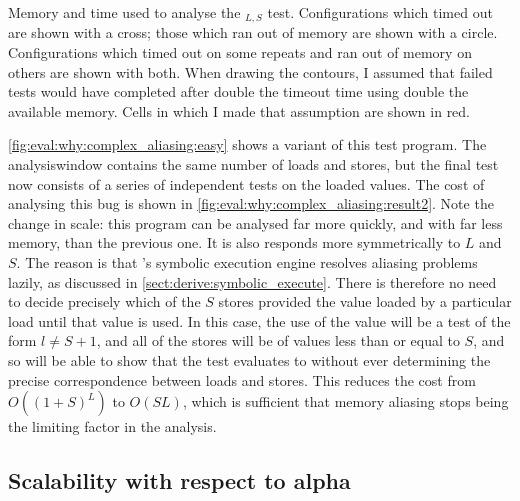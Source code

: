 \begin{sanefig}
  \caption{Memory and time used to analyse the
    $_{L,S}$ test.  Configurations which
    timed out are shown with a cross; those which ran out of memory
    are shown with a circle.  Configurations which timed out on some
    repeats and ran out of memory on others are shown with both.  When
    drawing the contours, I assumed that failed tests would have
    completed after double the timeout time using double the available
    memory.  Cells in which I made that assumption are shown in red.}
  \label{fig:eval:why:complex_aliasing:result2}
\end{sanefig}

\autoref{fig:eval:why:complex_aliasing:easy} shows a variant of this
test program.  The \gls{analysiswindow} contains the same number of
loads and stores, but the final test now consists of a series of
independent tests on the loaded values.  The cost of analysing this
bug is shown in \autoref{fig:eval:why:complex_aliasing:result2}.  Note
the change in scale: this program can be analysed far more quickly,
and with far less memory, than the previous one.  It is also responds
more symmetrically to $L$ and $S$.  The reason is that {\technique}'s
symbolic execution engine resolves aliasing problems lazily, as
discussed in \autoref{sect:derive:symbolic_execute}.  There is
therefore no need to decide precisely which of the $S$ stores provided
the value loaded by a particular load until that value is
used.  In this case, the use of the value will be a
test of the form $l \not= S+1$, and all of the stores will be of
values less than or equal to $S$, and so {\technique} will be able to
show that the test evaluates to {\true} without ever determining the
precise correspondence between loads and stores.  This reduces the
cost from $O((1+S)^L)$ to $O(SL)$, which is sufficient that memory
aliasing stops being the limiting factor in the analysis.


\subsection{Scalability with respect to \gls{alpha}}


